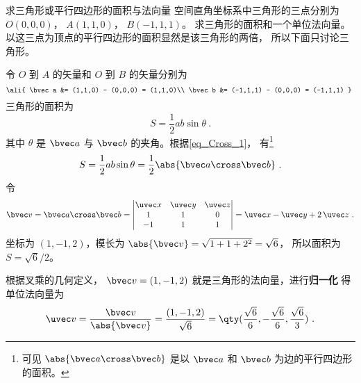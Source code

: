 \begin{example}{求三角形或平行四边形的面积与法向量}\label{ex_Cross_1}
空间直角坐标系中三角形的三点分别为 $O(0,0,0)$，  $A(1,1,0)$，  $B(-1,1,1)$。 求三角形的面积和一个单位法向量。 以这三点为顶点的平行四边形的面积显然是该三角形的两倍， 所以下面只讨论三角形。

令 $O$ 到 $A$ 的矢量和  $O$ 到 $B$ 的矢量分别为
\begin{equation}
\ali{
\bvec a  &= (1,1,0) - (0,0,0) = (1,1,0)\\
\bvec b  &= (-1,1,1) - (0,0,0) = (-1,1,1)
}~\end{equation}
三角形的面积为
 \begin{equation}
S = \frac12 ab \sin \theta ~.
\end{equation}
其中 $\theta $ 是 $\bvec a$ 与 $\bvec b$ 的夹角。根据\autoref{eq_Cross_1}， 有\footnote{可见 $\abs{\bvec a\cross\bvec b}$ 是以 $\bvec a$ 和 $\bvec b$ 为边的平行四边形的面积。}
\begin{equation}
S = \frac12 ab \sin \theta  = \frac12 \abs{\bvec a\cross\bvec b}~.
\end{equation}
令
\begin{equation}
\bvec v = \bvec a \cross \bvec b = 
\begin{vmatrix} \uvec x & \uvec y & \uvec z \\ 1&1&0\\-1&1&1 \end{vmatrix}
= \uvec x - \uvec y + 2\,\uvec z ~.
\end{equation}
坐标为 $(1,-1,2)$，模长为 $\abs{\bvec v} = \sqrt{1 + 1 + 2^2} = \sqrt 6$， 所以面积为 $S = \sqrt 6 /2$。 

根据叉乘的几何定义， $\bvec v = (1,-1,2)$ 就是三角形的法向量，进行\textbf{归一化}
得单位法向量为
 \begin{equation}
\uvec v = \frac{\bvec v}{\abs{\bvec v}} = \frac{(1,-1,2)}{\sqrt 6} = \qty( \frac{\sqrt 6 }{6}, - \frac{\sqrt 6 }{6}, \frac{\sqrt 6 }{3} )~.
\end{equation}
\end{example}

